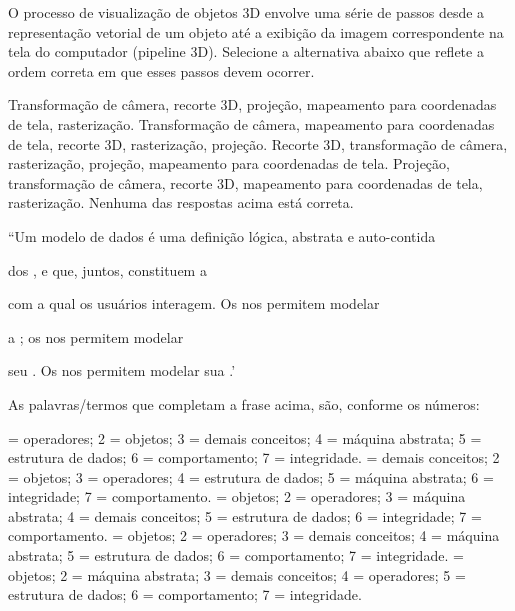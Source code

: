 \documentclass[12pt, addpoints]{exam}
\begin{document}
\begin{questions}
\question

O processo de visualização de objetos 3D envolve uma série de passos desde a representação vetorial de um objeto até a exibição da imagem correspondente na tela do computador (pipeline 3D). Selecione a alternativa abaixo que reflete a ordem correta em que esses passos devem ocorrer. 
\begin{choices}
\choice Transformação de câmera, recorte 3D, projeção, mapeamento para coordenadas de tela, rasterização. 
\choice Transformação de câmera, mapeamento para coordenadas de tela, recorte 3D, rasterização, projeção. 
\choice Recorte 3D, transformação de câmera, rasterização, projeção, mapeamento para coordenadas de tela. 
\choice Projeção, transformação de câmera, recorte 3D, mapeamento para coordenadas de tela, rasterização. 
\choice Nenhuma das respostas acima está correta.
\end{choices}

\question

``Um modelo de dados é uma definição lógica, abstrata e auto-contida

dos ,  e  que, juntos, constituem a 

com a qual os usuários interagem. Os  nos permitem modelar

a ; os  nos permitem modelar

seu . Os  nos permitem modelar sua .'



As palavras/termos que completam a frase acima, são, conforme os números:


\begin{choices}
 = operadores; 2 = objetos; 3 = demais conceitos; 4 = máquina abstrata; 5 = estrutura de dados; 6 = comportamento; 7 = integridade.
 = demais conceitos; 2 = objetos; 3 = operadores; 4 = estrutura de dados; 5 = máquina abstrata; 6 = integridade; 7 = comportamento.
 = objetos; 2 = operadores; 3 = máquina abstrata; 4 = demais conceitos; 5 = estrutura de dados; 6 = integridade; 7 = comportamento.
 = objetos; 2 = operadores; 3 = demais conceitos; 4 = máquina abstrata; 5 = estrutura de dados; 6 = comportamento; 7 = integridade.
 = objetos; 2 = máquina abstrata; 3 = demais conceitos; 4 = operadores; 5 = estrutura de dados; 6 = comportamento; 7 = integridade.
\end{choices}

\question


\end{questions}
\end{document}
